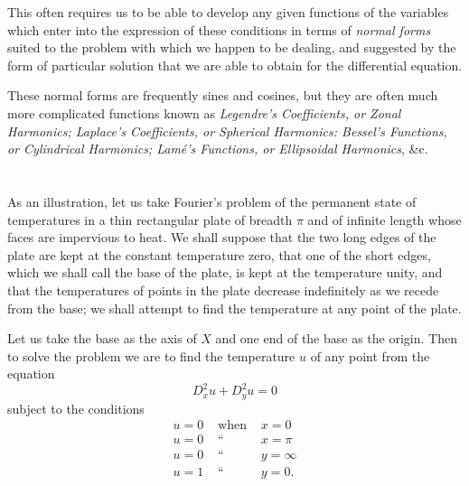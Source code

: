 \documentclass[oneside,12pt]{book}
\renewcommand{\theequation}{\Roman{equation}}
\begin{document}
This often requires us to be able to develop any given functions of the variables which enter into the expression of these conditions in terms of \textit{normal forms} suited to the problem with which we happen to be dealing, and suggested by the form of particular solution that we are able to obtain for the differential equation. \par 

These normal forms are frequently sines and cosines, but they are often much more complicated functions known as \textit{Legendre's Coefficients, \emph{or} Zonal Harmonics; Laplace's Coefficients, \emph{or} Spherical Harmonics: Bessel's Functions, \emph{or} Cylindrical Harmonics; Lam\'e's Functions, \emph{or} Ellipsoidal Harmonics}, \&c. \par 

\section{} As an illustration, let us take Fourier's problem of the permanent state of temperatures in a thin rectangular plate of breadth $\pi$ and of infinite length whose faces are impervious to heat. We shall suppose that the two long edges of the plate are kept at the constant temperature zero, that one of the short edges, which we shall call the base of the plate, is kept at the temperature unity, and that the temperatures of points in the plate decrease indefinitely as we recede from the base; we shall attempt to find the temperature at any point of the plate. \par 

Let us take the base as the axis of $X$ and one end of the base as the origin. Then to solve the problem we are to find the temperature $u$ of any point from the equation
\begin{equation}
    D_x^2u+D_y^2u=0
    \tag{III Art. 1}
    \label{eq3Art}
\end{equation}
subject to the conditions 
\renewcommand{\theequation}{\arabic{equation}}
\setcounter{equation}{0}
\begin{eqnarray}
    u=0 & \text{ when } & x=0 \label{con1}\\
    u=0 & \text{ `` } & x=\pi \label{con2}\\
    u=0 & \text{ `` } & y=\infty \label{con3}\\
    u=1 & \text{ `` } & y=0. \label{con4}
\end{eqnarray} \par 
\end{document}
